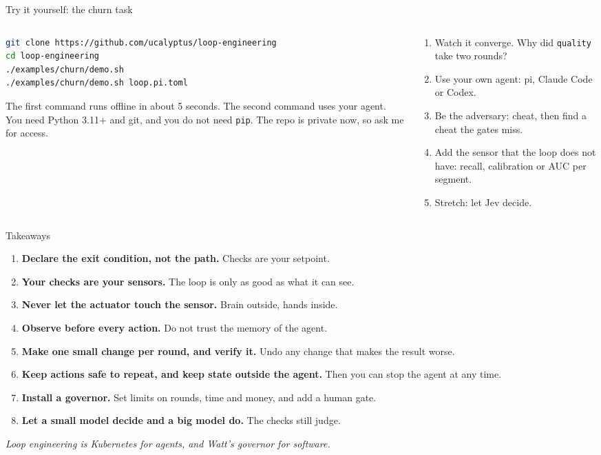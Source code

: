 \documentclass[aspectratio=169]{beamer}
\begin{document}
\begin{frame}[fragile]{Try it yourself: the churn task}
  \begin{columns}[T]
    \begin{column}{0.5\textwidth}
\begin{lstlisting}[language=bash, numbers=none, basicstyle=\ttfamily\tiny]
git clone https://github.com/ucalyptus/loop-engineering
cd loop-engineering
./examples/churn/demo.sh
./examples/churn/demo.sh loop.pi.toml
\end{lstlisting}
      \small The first command runs offline in about 5 seconds. The second command uses your agent. You need Python 3.11+ and git, and you do not need \texttt{pip}. The repo is private now, so ask me for access.
    \end{column}
    \begin{column}{0.46\textwidth}
      \begin{enumerate}
        \item Watch it converge. Why did \texttt{quality} take two rounds?
        \item Use your own agent: pi, Claude Code or Codex.
        \item Be the adversary: cheat, then find a cheat the gates miss.
        \item Add the sensor that the loop does not have: recall, calibration or AUC per segment.
        \item Stretch: let Jev decide.
      \end{enumerate}
    \end{column}
  \end{columns}
\end{frame}

\begin{frame}{Takeaways}
  \begin{enumerate}
    \item \textbf{Declare the exit condition, not the path.} Checks are your setpoint.
    \item \textbf{Your checks are your sensors.} The loop is only as good as what it can see.
    \item \textbf{Never let the actuator touch the sensor.} Brain outside, hands inside.
    \item \textbf{Observe before every action.} Do not trust the memory of the agent.
    \item \textbf{Make one small change per round, and verify it.} Undo any change that makes the result worse.
    \item \textbf{Keep actions safe to repeat, and keep state outside the agent.} Then you can stop the agent at any time.
    \item \textbf{Install a governor.} Set limits on rounds, time and money, and add a human gate.
    \item \textbf{Let a small model decide and a big model do.} The checks still judge.
  \end{enumerate}
  \vspace{0.2cm}
  \centering\textit{Loop engineering is Kubernetes for agents, and Watt's governor for software.}
\end{frame}
\end{document}
